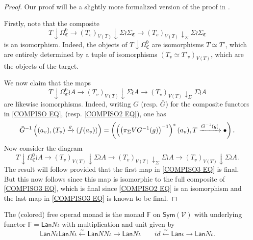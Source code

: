 \documentclass[a4paper,10pt
,draft
]{article}%
\renewcommand{\1}{\eta}%
\begin{document}
\begin{proof}
Our proof will be a slightly more formalized version of the proof in \cite[Lemma 4.28]{BP_geo}.

Firstly, note that the composite
\begin{equation}\label{COMPISO EQ}
T \downarrow \Omega^0_{\mathfrak{C}} 
	\to 
\left( T_v \right)_{V(T)} \downarrow \Sigma \wr \Sigma_{\mathfrak{C}}
	\to
\left( T_v \right)_{V(T)} \downarrow_{\Sigma} \Sigma \wr \Sigma_{\mathfrak{C}}
\end{equation}
is an isomorphism. Indeed, the objects of 
$T \downarrow \Omega^0_{\mathfrak{C}}$
are isomorphisms $T \simeq T'$, which are entirely determined by 
a tuple of isomorphisms $\left(T_v \simeq T'_v\right)_{V(T)}$,
which are the objects of the target. 

We now claim that the maps
\begin{equation}\label{COMPISO2 EQ}
T \downarrow \Omega^0_{\mathfrak{C}} \wr A
	\to 
\left( T_v \right)_{V(T)} \downarrow \Sigma \wr A
	\to
\left( T_v \right)_{V(T)} \downarrow_{\Sigma} \Sigma \wr A
\end{equation}
are likewise isomorphisms.
Indeed, writing $G$ (resp. $\bar{G}$) for the composite functors in \eqref{COMPISO EQ}, (resp. \eqref{COMPISO2 EQ}), one has
\[
\bar{G}^{-1}
\left((a_v), (T_v) \xrightarrow{g} (f(a_v))\right)=
\left(\left(\left(\pi_{\Sigma} V G^{-1}(g)\right)^{-1}\right)^{\**} (a_v),
T \xrightarrow{G^{-1}(g)} \bullet
\right).
\]
Now consider the diagram
\begin{equation}\label{COMPISO3 EQ}
T \downarrow \Omega^0_{\mathfrak{C}} \wr A
	\to 
\left( T_v \right)_{V(T)} \downarrow \Sigma \wr A
	\to
\left( T_v \right)_{V(T)} \downarrow_{\Sigma} \Sigma \wr A
	\to 
\left( T_v \right)_{V(T)} \downarrow \Sigma \wr A.
\end{equation}
The result will follow provided that the first map in \eqref{COMPISO3 EQ} is final. But this now follows since this map is isomorphic to the full composite of \eqref{COMPISO3 EQ}, which is final since \eqref{COMPISO2 EQ} is an isomorphism and the last map in \eqref{COMPISO3 EQ} is known to be final.
\end{proof}



\begin{definition}
The (colored) free operad monad is the monad
$\mathbb{F}$ on $\mathsf{Sym}(\mathcal{V})$
with underlying functor
$\mathbb{F} = \mathsf{Lan} N \iota$ with multiplication and unit given by
\[
	\mathsf{Lan} N \iota \mathsf{Lan} N \iota \xleftarrow{\simeq} 
	\mathsf{Lan} N N \iota \to 
	\mathsf{Lan} N \iota
\qquad
	id \xleftarrow{\simeq} 
	\mathsf{Lan} \iota \to
	\mathsf{Lan} N \iota.
\]
\end{definition}
\end{document}
